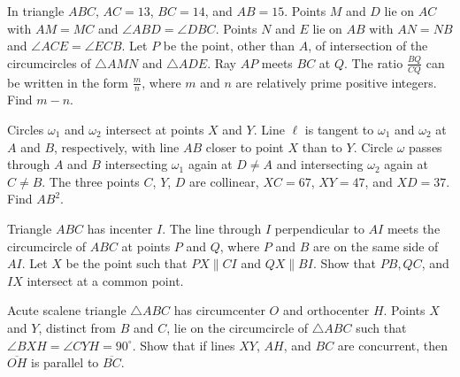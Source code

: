 \documentclass[mast]{lucky}
\begin{document}
\begin{prob}[AIME II 2010/15]{6}
In triangle $ABC$, $AC = 13$, $BC = 14$, and $AB=15$. Points $M$ and $D$ lie on $AC$ with $AM=MC$ and $\angle ABD = \angle DBC$. Points $N$ and $E$ lie on $AB$ with $AN=NB$ and $\angle ACE = \angle ECB$. Let $P$ be the point, other than $A$, of intersection of the circumcircles of $\triangle AMN$ and $\triangle ADE$. Ray $AP$ meets $BC$ at $Q$. The ratio $\frac{BQ}{CQ}$ can be written in the form $\frac{m}{n}$, where $m$ and $n$ are relatively prime positive integers. Find $m-n.$
\end{prob}

\begin{prob}[AIME I 2016/15]{6}
Circles $\omega_1$ and $\omega_2$ intersect at points $X$ and $Y$. Line $\ell$ is tangent to $\omega_1$ and $\omega_2$ at $A$ and $B$, respectively, with line $AB$ closer to point $X$ than to $Y$. Circle $\omega$ passes through $A$ and $B$ intersecting $\omega_1$ again at $D \neq A$ and intersecting $\omega_2$ again at $C \neq B$. The three points $C$, $Y$, $D$ are collinear, $XC = 67$, $XY = 47$, and $XD = 37$. Find $AB^2$.
\end{prob}

\begin{prob}[PUMaC 2017]{9}
Triangle $ABC$ has incenter $I$. The line through $I$ perpendicular to $AI$ meets the circumcircle of $ABC$ at points $P$ and $Q$, where $P$ and $B$ are on the same side of $AI$. Let $X$ be the point such that $PX \parallel CI$ and $QX \parallel BI$. Show that $PB, QC$, and $IX$ intersect at a common point.
\end{prob}

\begin{prob}[USAMTS 2018]{13}
Acute scalene triangle $\triangle ABC$ has circumcenter $O$ and orthocenter $H$. Points $X$ and $Y$, distinct from $B$ and $C$, lie on the circumcircle of $\triangle ABC$ such that $\angle BXH = \angle CYH = 90^\circ$. Show that if lines $XY$, $AH$, and $BC$ are concurrent, then $\overline{OH}$ is parallel to $\overline{BC}$.
\end{prob}
\end{document}
